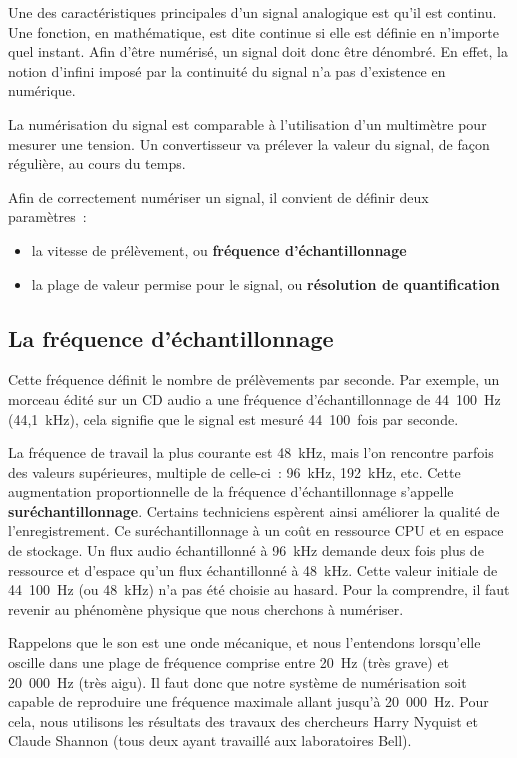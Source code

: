 \documentclass[
]{book}
\providecommand{\tightlist}{%
  \setlength{\itemsep}{0pt}\setlength{\parskip}{0pt}}
\begin{document}
Une des caractéristiques principales d'un signal analogique est qu'il est continu. Une fonction, en mathématique, est dite continue si elle est définie en n'importe quel instant. Afin d'être numérisé, un signal doit donc être dénombré. En effet, la notion d'infini imposé par la continuité du signal n'a pas d'existence en numérique.

La numérisation du signal est comparable à l'utilisation d'un multimètre pour mesurer une tension. Un convertisseur va prélever la valeur du signal, de façon régulière, au cours du temps.

Afin de correctement numériser un signal, il convient de définir deux paramètres~:

\begin{itemize}
\tightlist
\item
  la vitesse de prélèvement, ou \textbf{fréquence d'échantillonnage}
\item
  la plage de valeur permise pour le signal, ou \textbf{résolution de quantification}
\end{itemize}

\hypertarget{la-fruxe9quence-duxe9chantillonnage}{%
\subsection{La fréquence d'échantillonnage}\label{la-fruxe9quence-duxe9chantillonnage}}

Cette fréquence définit le nombre de prélèvements par seconde. Par exemple, un morceau édité sur un CD audio a une fréquence d'échantillonnage de 44~100~Hz (44,1~kHz), cela signifie que le signal est mesuré 44~100~fois par seconde.

La fréquence de travail la plus courante est 48~kHz, mais l'on rencontre parfois des valeurs supérieures, multiple de celle-ci~: 96~kHz, 192~kHz, etc. Cette augmentation proportionnelle de la fréquence d'échantillonnage s'appelle \textbf{suréchantillonnage}. Certains techniciens espèrent ainsi améliorer la qualité de l'enregistrement. Ce suréchantillonnage à un coût en ressource CPU et en espace de stockage. Un flux audio échantillonné à 96~kHz demande deux fois plus de ressource et d'espace qu'un flux échantillonné à 48~kHz. Cette valeur initiale de 44~100~Hz (ou 48~kHz) n'a pas été choisie au hasard. Pour la comprendre, il faut revenir au phénomène physique que nous cherchons à numériser.

Rappelons que le son est une onde mécanique, et nous l'entendons lorsqu'elle oscille dans une plage de fréquence comprise entre 20~Hz (très grave) et 20~000~Hz (très aigu). Il faut donc que notre système de numérisation soit capable de reproduire une fréquence maximale allant jusqu'à 20~000~Hz. Pour cela, nous utilisons les résultats des travaux des chercheurs Harry Nyquist et Claude Shannon (tous deux ayant travaillé aux laboratoires Bell).
\end{document}
